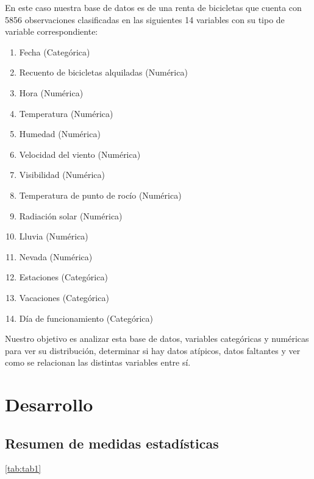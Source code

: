 \documentclass[]{elsarticle} %
\providecommand{\tightlist}{%
  \setlength{\itemsep}{0pt}\setlength{\parskip}{0pt}}
\begin{document}
En este caso nuestra base de datos es de una renta de bicicletas que
cuenta con 5856 observaciones clasificadas en las siguientes 14
variables con su tipo de variable correspondiente:

\begin{enumerate}
\def\labelenumi{\arabic{enumi}.}
\tightlist
\item
  Fecha (Categórica)
\item
  Recuento de bicicletas alquiladas (Numérica)
\item
  Hora (Numérica)
\item
  Temperatura (Numérica)
\item
  Humedad (Numérica)
\item
  Velocidad del viento (Numérica)
\item
  Visibilidad (Numérica)
\item
  Temperatura de punto de rocío (Numérica)
\item
  Radiación solar (Numérica)
\item
  Lluvia (Numérica)
\item
  Nevada (Numérica)
\item
  Estaciones (Categórica)
\item
  Vacaciones (Categórica)
\item
  Día de funcionamiento (Categórica)
\end{enumerate}

Nuestro objetivo es analizar esta base de datos, variables categóricas y
numéricas para ver su distribución, determinar si hay datos atípicos,
datos faltantes y ver como se relacionan las distintas variables entre
sí.

\newpage
\section{Desarrollo}

\subsection{Resumen de medidas estadísticas}

\ref{tab:tab1} \newpage
\end{document}
